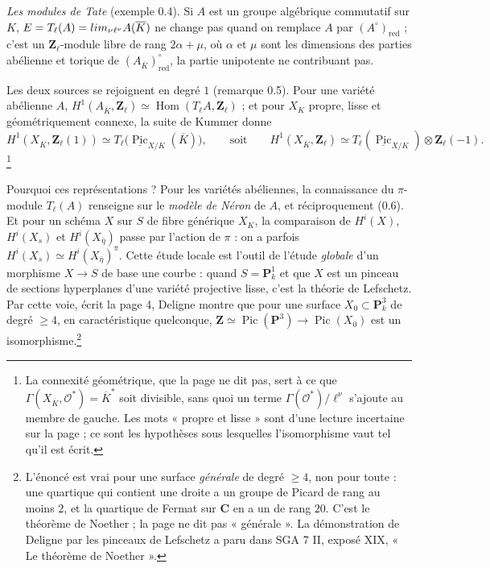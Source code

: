 \documentclass[11pt,a4paper]{article}
\begin{document}
\emph{Les modules de Tate} (exemple 0.4). Si $A$ est un groupe algébrique
commutatif sur $K$, $E = T_\ell(A) = \varprojlim_\nu {}_{\ell^\nu}A(\overline K)$
ne change pas quand on remplace $A$ par $(A^\circ)_{\mathrm{red}}$ ; c'est un
$\mathbf{Z}_\ell$-module libre de rang $2\alpha + \mu$, où $\alpha$ et $\mu$ sont
les dimensions des parties abélienne et torique de
$(A_{\overline K})^\circ_{\mathrm{red}}$, la partie unipotente ne contribuant
pas.

Les deux sources se rejoignent en degré $1$ (remarque 0.5). Pour une variété
abélienne $A$, $H^1(A_{\overline K}, \mathbf{Z}_\ell) \simeq
\operatorname{Hom}(T_\ell A, \mathbf{Z}_\ell)$ ; et pour $X_K$ propre, lisse et
géométriquement connexe, la suite de Kummer donne
\[
  H^1(X_{\overline K}, \mathbf{Z}_\ell(1)) \simeq
  T_\ell\bigl(\underline{\operatorname{Pic}}_{X/K}(\overline K)\bigr),
  \qquad\text{soit}\qquad
  H^1(X_{\overline K}, \mathbf{Z}_\ell) \simeq
  T_\ell(\underline{\operatorname{Pic}}_{X/K}) \otimes \mathbf{Z}_\ell(-1).
\]
\footnote{La connexité géométrique, que la page ne dit pas, sert à ce que
$\Gamma(X_{\overline K}, \mathcal{O}^*) = \overline K^*$ soit divisible, sans
quoi un terme $\Gamma(\mathcal{O}^*)/\ell^\nu$ s'ajoute au membre de gauche. Les
mots « propre et lisse » sont d'une lecture incertaine sur la page ; ce sont
les hypothèses sous lesquelles l'isomorphisme vaut tel qu'il est écrit.}

Pourquoi ces représentations ? Pour les variétés abéliennes, la connaissance du
$\pi$-module $T_\ell(A)$ renseigne sur le \emph{modèle de Néron} de $A$, et
réciproquement (0.6). Et pour un schéma $X$ sur $S$ de fibre générique $X_K$,
la comparaison de $H^i(X)$, $H^i(X_s)$ et $H^i(X_{\bar\eta})$ passe par
l'action de $\pi$ : on a parfois $H^i(X_s) \simeq H^i(X_{\bar\eta})^\pi$. Cette
étude locale est l'outil de l'étude \emph{globale} d'un morphisme $X \to S$ de
base une courbe : quand $S = \mathbf{P}^1_k$ et que $X$ est un pinceau de
sections hyperplanes d'une variété projective lisse, c'est la théorie de
Lefschetz. Par cette voie, écrit la page 4, Deligne montre que pour une surface
$X_0 \subset \mathbf{P}^3_k$ de degré $\geq 4$, en caractéristique quelconque,
$\mathbf{Z} \simeq \operatorname{Pic}(\mathbf{P}^3) \to \operatorname{Pic}(X_0)$
est un isomorphisme.\footnote{L'énoncé est vrai pour une surface \emph{générale}
de degré $\geq 4$, non pour toute : une quartique qui contient une droite a un
groupe de Picard de rang au moins $2$, et la quartique de Fermat sur
$\mathbf{C}$ en a un de rang $20$. C'est le théorème de Noether ; la page ne dit
pas « générale ». La démonstration de Deligne par les pinceaux de Lefschetz a
paru dans SGA 7 II, exposé XIX, « Le théorème de Noether ».}
\end{document}
